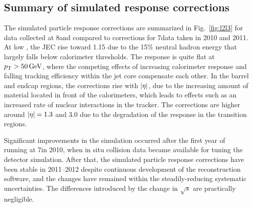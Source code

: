 \documentclass[11pt,twoside,a4paper,cmspaper,final,collab]{cms-tdr}
\begin{document}
\subsection{Summary of simulated response corrections}

The simulated particle response corrections are summarized in Fig.~\ref{fig:l2l3} for data collected at 8\TeV and compared to corrections for 7\TeV data taken in 2010 and 2011. At low \pt, the JEC rise toward 1.15 due to the 15\% neutral hadron energy that largely falls below calorimeter thresholds. The response is quite flat at $p_{\mathrm{T}}>50\,\text{Ge\hspace{-.08em}V}$, where the competing effects of increasing calorimeter response and falling tracking efficiency within the jet core compensate each other. In the barrel and endcap regions, the corrections rise with $\lvert \eta \rvert$, due to the increasing amount of material located in front of the calorimeters, which leads to effects such as an increased rate of nuclear interactions in the tracker. The corrections are higher around $\lvert \eta \rvert=1.3$ and $3.0$ due to the degradation of the response in the transition regions.

Significant improvements in the simulation occurred after the first year of running at 7\TeV in 2010, when in situ collision data became available for tuning the detector simulation.
After that, the simulated particle response corrections have been stable in 2011--2012 despite continuous development of the reconstruction software, and the changes have remained within the steadily-reducing systematic uncertainties. The differences introduced by the change in $\sqrt{s}$ are practically negligible.
\end{document}
